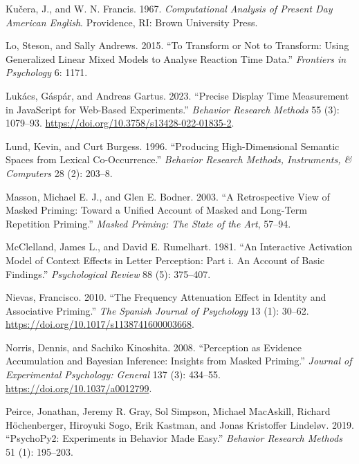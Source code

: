 \documentclass[
]{interact}
\newlength{\cslhangindent}
\newenvironment{CSLReferences}[2] %
 {\begin{list}{}{%
  \setlength{\itemindent}{0pt}
  \setlength{\leftmargin}{0pt}
  \setlength{\parsep}{0pt}
  \ifodd #1
   \setlength{\leftmargin}{\cslhangindent}
   \setlength{\itemindent}{-1\cslhangindent}
  \fi
  \setlength{\itemsep}{#2\baselineskip}}}
 {\end{list}}
\begin{document}
\begin{CSLReferences}{1}{0}
Kučera, J., and W. N. Francis. 1967. \emph{Computational Analysis of
Present Day American English}. Providence, RI: Brown University Press.

Lo, Steson, and Sally Andrews. 2015. {``To Transform or Not to
Transform: Using Generalized Linear Mixed Models to Analyse Reaction
Time Data.''} \emph{Frontiers in Psychology} 6: 1171.

Lukács, Gáspár, and Andreas Gartus. 2023. {``Precise Display Time
Measurement in JavaScript for Web-Based Experiments.''} \emph{Behavior
Research Methods} 55 (3): 1079--93.
\url{https://doi.org/10.3758/s13428-022-01835-2}.

Lund, Kevin, and Curt Burgess. 1996. {``Producing High-Dimensional
Semantic Spaces from Lexical Co-Occurrence.''} \emph{Behavior Research
Methods, Instruments, {\&} Computers} 28 (2): 203--8.

Masson, Michael E. J., and Glen E. Bodner. 2003. {``A Retrospective View
of Masked Priming: Toward a Unified Account of Masked and Long-Term
Repetition Priming.''} \emph{Masked Priming: The State of the Art},
57--94.

McClelland, James L., and David E. Rumelhart. 1981. {``An Interactive
Activation Model of Context Effects in Letter Perception: Part i. An
Account of Basic Findings.''} \emph{Psychological Review} 88 (5):
375--407.

Nievas, Francisco. 2010. {``The Frequency Attenuation Effect in Identity
and Associative Priming.''} \emph{The Spanish Journal of Psychology} 13
(1): 30--62. \url{https://doi.org/10.1017/s1138741600003668}.

Norris, Dennis, and Sachiko Kinoshita. 2008. {``Perception as Evidence
Accumulation and Bayesian Inference: Insights from Masked Priming.''}
\emph{Journal of Experimental Psychology: General} 137 (3): 434--55.
\url{https://doi.org/10.1037/a0012799}.

Peirce, Jonathan, Jeremy R. Gray, Sol Simpson, Michael MacAskill,
Richard Höchenberger, Hiroyuki Sogo, Erik Kastman, and Jonas Kristoffer
Lindeløv. 2019. {``PsychoPy2: Experiments in Behavior Made Easy.''}
\emph{Behavior Research Methods} 51 (1): 195--203.


\end{CSLReferences}
\end{document}
